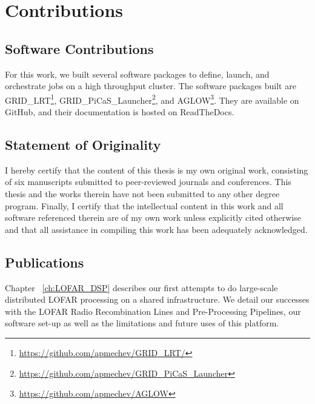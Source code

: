 \section{Contributions}



\subsection{Software Contributions}
 
For this work, we built several software packages to define, launch, and orchestrate jobs on a high throughput cluster. The software packages built are GRID\_LRT\footnote{\url{https://github.com/apmechev/GRID_LRT/}}, GRID\_PiCaS\_Launcher\footnote{\url{https://github.com/apmechev/GRID_PiCaS_Launcher}}, and AGLOW\footnote{\url{https://github.com/apmechev/AGLOW}}. They are available on GitHub, and their documentation is hosted on ReadTheDocs. 


\subsection{Statement of Originality}

I hereby certify that the content of this thesis is my own original work, consisting of six manuscripts submitted to peer-reviewed journals and conferences. This thesis and the works therein have not been submitted to any other degree program. Finally, I certify that the intellectual content in this work and all software referenced therein are of my own work unless explicitly cited otherwise and that all assistance in compiling this work has been adequately acknowledged.

\subsection{Publications}

Chapter ~\ref{ch:LOFAR_DSP} describes our first attempts to do large-scale distributed LOFAR processing on a shared infrastructure. We detail our successes with the LOFAR Radio Recombination Lines and Pre-Processing Pipelines, our software set-up as well as the limitations and future uses of this platform.  


